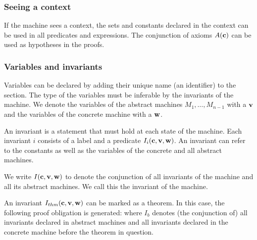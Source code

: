 
\subsubsection{Seeing a context}
If the machine sees a context, the sets and constants declared in the context can be used in
 all predicates and expressions.
The conjunction of axioms $A(\mathbf{c})$ can be used as hypotheses in the proofs.

\subsubsection{Variables and invariants}
Variables can be declared by adding their unique name (an identifier) to the  section. 
The type of the variables must be inferable by the invariants of the machine.
We denote the variables of the abstract machines $M_1,\ldots,M_{n-1}$ with a $\mathbf{v}$ and the variables of the concrete machine with a $\mathbf{w}$.

An invariant is a statement that must hold at each state of the machine.
Each invariant $i$ consists of a label and a predicate $I_i(\mathbf{c},\mathbf{v},\mathbf{w})$.
An invariant can refer to the constants as well as the variables of the concrete and all abstract machines.

We write $I(\mathbf{c},\mathbf{v},\mathbf{w})$ to denote the conjunction of all invariants
of the machine and all its abstract machines. We call this the invariant of the machine.

An invariant $I_{thm}(\mathbf{c},\mathbf{v},\mathbf{w})$ can be marked as a theorem. In this case, the following proof obligation is generated:
where $I_b$ denotes (the conjunction of) all invariants declared in abstract machines and all invariants declared in the concrete machine before
the theorem in question.

